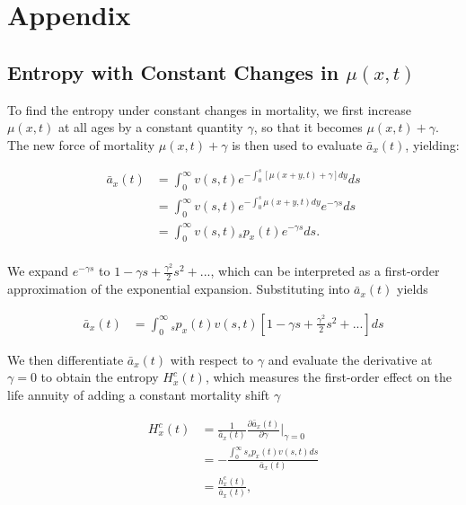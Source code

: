 \documentclass[12pt]{article}
\begin{document}
\section{Appendix}


\subsection{Entropy with Constant Changes in $\mu(x,t)$}\label{sec:EntropyConst}

 \color{blue}To find the entropy under constant changes in mortality, we first increase $\mu(x,t)$ at all ages by a constant quantity $\gamma$, so that it becomes $\mu(x,t)+\gamma$. The new force of mortality $\mu(x,t)+\gamma$ is then used to evaluate $\bar{a}_{x}(t)$, yielding: 

\begin{equation}\label{eq:EntropyConst1}
\begin{split}
\bar{a}_{x}(t) &= \int_0^\infty{v}(s,t) e^{-\int_{0}^{s} [\mu(x+y,t)+\gamma]dy}ds \\
&= \int_0^\infty {v}(s,t)e^{-\int_{0}^{s} \mu(x+y,t)dy} e^{-\gamma s}ds \\
&= \int_0^\infty {v}(s,t){}_sp_x(t) e^{-\gamma s}ds. \\
\end{split}
\end{equation}


We expand $e^{-\gamma s}$ to $1-\gamma s+\frac{\gamma^2}{2} s^{2} +...$,  which can be interpreted as a first-order approximation of the exponential expansion. Substituting into $\bar{a}_{x}(t)$ yields


\begin{equation}\label{eq:EntropyConst2}
\begin{split}
\bar{a}_{x}(t) &= \int_0^\infty {}_sp_x(t) {v}(s,t)[1-\gamma s+\frac{\gamma^2}{2} s^{2} +...]ds
\end{split}
\end{equation}



We then differentiate $\bar{a}_{x}(t)$ with respect to $\gamma$ and evaluate the derivative at $\gamma=0$ to obtain the entropy ${H}^{c}_x(t)$, which measures the first-order effect on the life annuity of adding a constant mortality shift $\gamma$


\begin{equation}\label{eq:EntropyConst3}
\begin{split}
{H}^{c}_x(t)&=\frac{1}{\bar{a}_x(t)}\frac{\partial \bar{a}_x(t)}{\partial \gamma} \bigg\rvert_{\gamma=0}\\
&= -\frac{\int_0^\infty s {}_sp_x(t) {v}(s,t)ds}{\bar{a}_x(t)} \\
&= \frac{{h}^{c}_x(t)}{\bar{a}_x(t)},
\end{split}
\end{equation}
\end{document}
